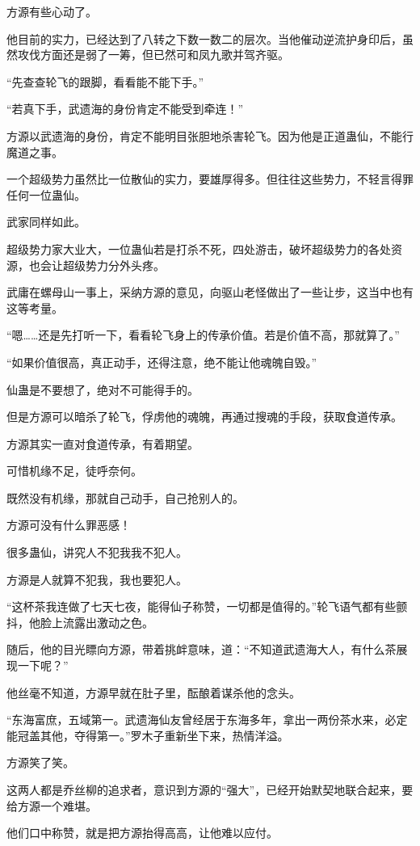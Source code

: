 \begin{this_body}
方源有些心动了。

他目前的实力，已经达到了八转之下数一数二的层次。当他催动逆流护身印后，虽然攻伐方面还是弱了一筹，但已然可和凤九歌并驾齐驱。

“先查查轮飞的跟脚，看看能不能下手。”

“若真下手，武遗海的身份肯定不能受到牵连！”

方源以武遗海的身份，肯定不能明目张胆地杀害轮飞。因为他是正道蛊仙，不能行魔道之事。

一个超级势力虽然比一位散仙的实力，要雄厚得多。但往往这些势力，不轻言得罪任何一位蛊仙。

武家同样如此。

超级势力家大业大，一位蛊仙若是打杀不死，四处游击，破坏超级势力的各处资源，也会让超级势力分外头疼。

武庸在螺母山一事上，采纳方源的意见，向驱山老怪做出了一些让步，这当中也有这等考量。

“嗯……还是先打听一下，看看轮飞身上的传承价值。若是价值不高，那就算了。”

“如果价值很高，真正动手，还得注意，绝不能让他魂魄自毁。”

仙蛊是不要想了，绝对不可能得手的。

但是方源可以暗杀了轮飞，俘虏他的魂魄，再通过搜魂的手段，获取食道传承。

方源其实一直对食道传承，有着期望。

可惜机缘不足，徒呼奈何。

既然没有机缘，那就自己动手，自己抢别人的。

方源可没有什么罪恶感！

很多蛊仙，讲究人不犯我我不犯人。

方源是人就算不犯我，我也要犯人。

“这杯茶我连做了七天七夜，能得仙子称赞，一切都是值得的。”轮飞语气都有些颤抖，他脸上流露出激动之色。

随后，他的目光瞟向方源，带着挑衅意味，道：“不知道武遗海大人，有什么茶展现一下呢？”

他丝毫不知道，方源早就在肚子里，酝酿着谋杀他的念头。

“东海富庶，五域第一。武遗海仙友曾经居于东海多年，拿出一两份茶水来，必定能冠盖其他，夺得第一。”罗木子重新坐下来，热情洋溢。

方源笑了笑。

这两人都是乔丝柳的追求者，意识到方源的“强大”，已经开始默契地联合起来，要给方源一个难堪。

他们口中称赞，就是把方源抬得高高，让他难以应付。


\end{this_body}
